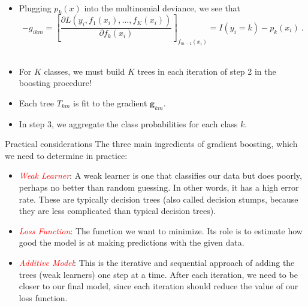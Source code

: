 \documentclass[
  10pt,
  ignorenonframetext,
]{beamer}
\providecommand{\tightlist}{%
  \setlength{\itemsep}{0pt}\setlength{\parskip}{0pt}}
\begin{document}
\begin{frame}
\(~\)

\begin{itemize}
\item
  Plugging \(p_k(x)\) into the multinomial deviance, we see that\\
  \[-g_{ikm} = \left[ \frac{\partial L(y_i, f_1(x_i),\ldots, f_K(x_i))}{\partial f_k(x_i)} \right]_{f_{m-1}(x_i)} = I(y_i =k) - p_k(x_i) \ .\]
  \(~\)
\item
  For \(K\) classes, we must build \(K\) trees in each iteration of step
  2 in the boosting procedure!
\end{itemize}

\vspace{2mm}

\begin{itemize}
\tightlist
\item
  Each tree \(T_{km}\) is fit to the gradient \(\mathbf{g}_{km}\).
\end{itemize}

\vspace{2mm}

\begin{itemize}
\tightlist
\item
  In step 3, we aggregate the class probabilities for each class \(k\).
\end{itemize}
\end{frame}

\begin{frame}{Practical considerations}
\label{practical-considerations}
The three main ingredients of gradient boosting, which we need to
determine in practice:

\vspace{2mm}

\begin{itemize}
\item
  \emph{\textcolor{red}{Weak Learner}}: A weak learner is one that
  classifies our data but does poorly, perhaps no better than random
  guessing. In other words, it has a high error rate. These are
  typically decision trees (also called decision stumps, because they
  are less complicated than typical decision trees).
\item
  \emph{\textcolor{red}{Loss Function}}: The function we want to
  minimize. Its role is to estimate how good the model is at making
  predictions with the given data.
\item
  \emph{\textcolor{red}{Additive Model}}: This is the iterative and
  sequential approach of adding the trees (weak learners) one step at a
  time. After each iteration, we need to be closer to our final model,
  since each iteration should reduce the value of our loss function.
\end{itemize}
\end{frame}
\end{document}
